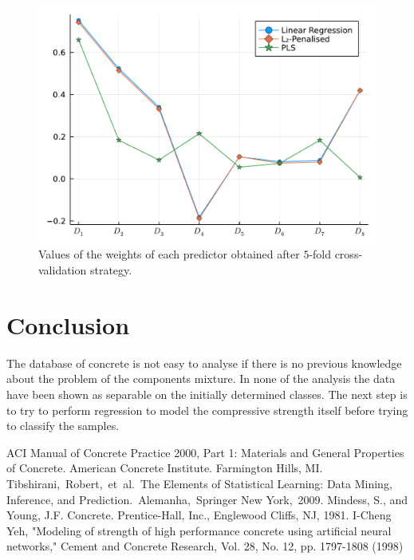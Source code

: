 \documentclass[conference]{IEEEtran}
\begin{document}
\begin{figure}[htbp]
\centerline{\includegraphics[width=\columnwidth]{../figures/fitted_params_kfolds}}
\caption{Values of the weights of each predictor obtained after $5$-fold cross-validation strategy.}%
\end{figure}







\section{Conclusion}\label{conclusions}

The database of concrete is not easy to analyse if there is no previous knowledge about the problem of the components mixture. In none of the analysis the data have been shown as separable on the initially determined classes. The next step is to try to perform regression to model the compressive strength itself before trying to classify the samples.

\begin{thebibliography}{00}
 ACI Manual of Concrete Practice 2000, Part 1: Materials and General Properties of Concrete.  American Concrete Institute.  Farmington Hills, MI.
 Tibshirani, Robert, et al. The Elements of  Statistical Learning:  Data Mining, Inference, and Prediction. Alemanha, Springer New York, 2009.
 Mindess, S., and Young, J.F. Concrete. Prentice-Hall, Inc., Englewood Cliffs, NJ, 1981.
 I-Cheng Yeh, "Modeling of strength of high performance concrete using artificial neural networks," Cement and Concrete Research, Vol. 28, No. 12, pp. 1797-1808 (1998)
\end{thebibliography}
\end{document}
